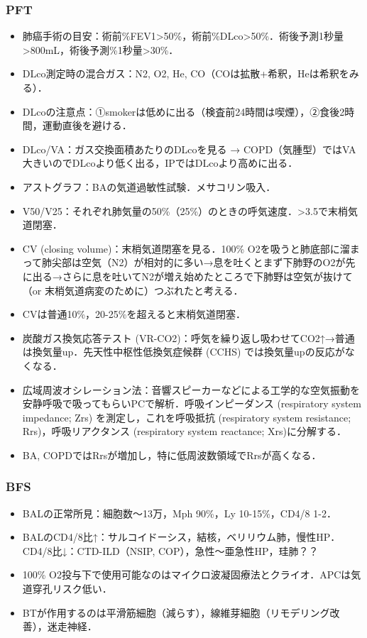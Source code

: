 \subsubsection{PFT}

\begin{itemize}
\item 肺癌手術の目安：術前\%FEV1>50\%，術前\%DLco>50\%．術後予測1秒量>800mL，術後予測\%1秒量>30\%．
\item DLco測定時の混合ガス：N2, O2, He, CO（COは拡散+希釈，Heは希釈をみる）．
\item DLcoの注意点：①smokerは低めに出る（検査前24時間は喫煙），②食後2時間，運動直後を避ける．
\item DLco/VA：ガス交換面積あたりのDLcoを見る → COPD（気腫型）ではVA大きいのでDLcoより低く出る，IPではDLcoより高めに出る．
\item アストグラフ：BAの気道過敏性試験．メサコリン吸入．
\item V50/V25：それぞれ肺気量の50\%（25\%）のときの呼気速度．>3.5で末梢気道閉塞．
\item CV (closing volume)：末梢気道閉塞を見る．100\% O2を吸うと肺底部に溜まって肺尖部は空気（N2）が相対的に多い→息を吐くとまず下肺野のO2が先に出る→さらに息を吐いてN2が増え始めたところで下肺野は空気が抜けて（or 末梢気道病変のために）つぶれたと考える．\item CVは普通10\%，20-25\%を超えると末梢気道閉塞．
\item 炭酸ガス換気応答テスト (VR-CO2)：呼気を繰り返し吸わせてCO2↑→普通は換気量up．先天性中枢性低換気症候群 (CCHS) では換気量upの反応がなくなる．
\item 広域周波オシレーション法：音響スピーカーなどによる工学的な空気振動を安静呼吸で吸ってもらいPCで解析．呼吸インピーダンス (respiratory system impedance; Zrs) を測定し，これを呼吸抵抗 (respiratory system resistance; Rrs)，呼吸リアクタンス (respiratory system reactance; Xrs)に分解する．
\item BA, COPDではRrsが増加し，特に低周波数領域でRrsが高くなる．
\end{itemize}


\subsubsection{BFS}

\begin{itemize}
\item BALの正常所見：細胞数〜13万，Mph 90\%，Ly 10-15\%，CD4/8 1-2．
\item BALのCD4/8比↑：サルコイドーシス，結核，ベリリウム肺，慢性HP．CD4/8比↓：CTD-ILD（NSIP, COP），急性〜亜急性HP，珪肺？？
\item 100\% O2投与下で使用可能なのはマイクロ波凝固療法とクライオ．APCは気道穿孔リスク低い．
\item BTが作用するのは平滑筋細胞（減らす），線維芽細胞（リモデリング改善），迷走神経．
\end{itemize}



